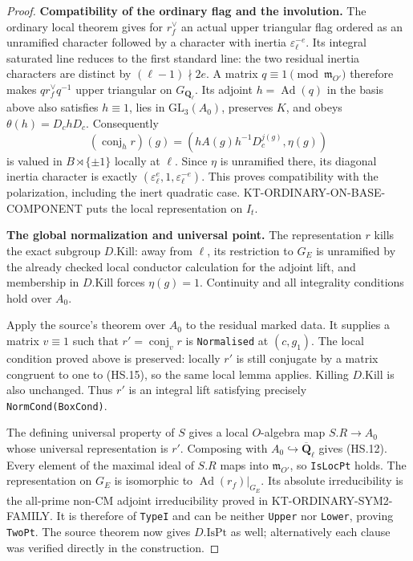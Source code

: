 \documentclass[11pt,a4paper]{article}
\theoremstyle{definition}
\renewcommand{\paragraph}[1]{\par\smallskip\noindent\textbf{#1}\quad\ignorespaces}
\begin{document}
\begin{proof}
\paragraph{Compatibility of the ordinary flag and the involution.}
The ordinary local theorem gives for $r_f^\vee$ an actual
upper triangular flag ordered as an unramified character
followed by a character with inertia
$\varepsilon_\ell^{-e}$.  Its integral saturated line
reduces to the first standard line: the two residual
inertia characters are distinct by
$(\ell-1)\nmid2e$.  A matrix $q\equiv1\pmod{\mathfrak m_{O'}}$
therefore makes $q r_f^\vee q^{-1}$ upper triangular
on $G_{\mathbf Q_\ell}$.  Its adjoint $h=\operatorname{Ad}(q)$
in the basis above also satisfies $h\equiv1$, lies in
$\mathrm{GL}_3(A_0)$, preserves $K$, and obeys
$\theta(h)=D_chD_c$.  Consequently
\[
 (\operatorname{conj}_h r)(g)
       =(hA(g)h^{-1}D_c^{j(g)},\eta(g))                     \tag{HS.15}
\]
is valued in $B\rtimes\{\pm1\}$ locally at $\ell$.
Since $\eta$ is unramified there, its diagonal inertia
character is exactly
$(\varepsilon_\ell^e,1,\varepsilon_\ell^{-e})$.
This proves compatibility with the polarization, including
the inert quadratic case.  KT-ORDINARY-ON-BASE-COMPONENT
puts the local representation on $I_t$.

\paragraph{The global normalization and universal point.}
The representation $r$ kills the exact subgroup
$D.\mathrm{Kill}$: away from $\ell$, its restriction to
$G_E$ is unramified by the already checked local conductor
calculation for the adjoint lift, and membership in
$D.\mathrm{Kill}$ forces $\eta(g)=1$.  Continuity and all
integrality conditions hold over $A_0$.

Apply the source's  theorem
over $A_0$ to the residual marked data.  It supplies a
matrix $v\equiv1$ such that $r'=\operatorname{conj}_v r$
is \texttt{Normalised} at $(c,g_1)$.  The local condition
proved above is preserved: locally $r'$ is still conjugate
by a matrix congruent to one to (HS.15), so the same local
lemma applies.  Killing $D.\mathrm{Kill}$ is also unchanged.
Thus $r'$ is an integral lift satisfying precisely
\texttt{NormCond(BoxCond)}.

The defining universal property of $S$ gives a local
$O$-algebra map $S.R\to A_0$ whose universal representation
is $r'$.  Composing with $A_0\hookrightarrow
\overline{\mathbf Q}_\ell$ gives (HS.12).
Every element of the maximal ideal of $S.R$ maps into
$\mathfrak m_{O'}$, so \texttt{IsLocPt} holds.
The representation on $G_E$ is isomorphic to
$\operatorname{Ad}(r_f)|_{G_E}$.  Its absolute
irreducibility is the all-prime non-CM adjoint
irreducibility proved in KT-ORDINARY-SYM2-FAMILY.
It is therefore of \texttt{TypeI} and can be neither
\texttt{Upper} nor \texttt{Lower}, proving \texttt{TwoPt}.
The source theorem  now gives
$D.\mathrm{IsPt}$ as well; alternatively each clause was
verified directly in the construction.
\end{proof}
\end{document}
